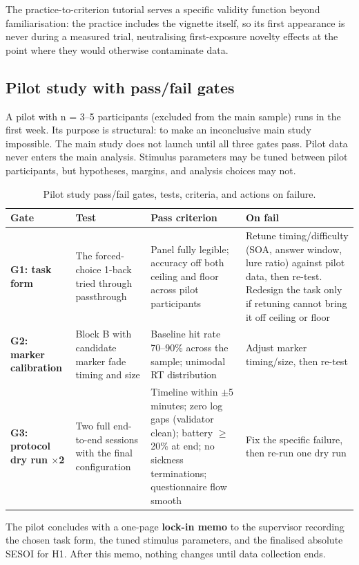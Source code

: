 The practice-to-criterion tutorial serves a specific validity function beyond familiarisation: the
practice includes the vignette itself, so its first appearance is never during a measured trial,
neutralising first-exposure novelty effects at the point where they would otherwise contaminate data.

\subsection{Pilot study with pass/fail gates}

A pilot with n = 3–5 participants (excluded from the main sample) runs in the first week. Its purpose
is structural: to make an inconclusive main study impossible. The main study does not launch until
all three gates pass. Pilot data never enters the main analysis. Stimulus parameters may be tuned
between pilot participants, but hypotheses, margins, and analysis choices may not.

\begin{longtable}{p{}|p{}|p{}|p{}}
\caption{Pilot study pass/fail gates, tests, criteria, and actions on failure.}\\
\hline
\textbf{Gate} & \textbf{Test} & \textbf{Pass criterion} & \textbf{On fail} \\
\hline
\endhead
\hline
\textbf{G1: task form} & The forced-choice 1-back tried through passthrough & Panel fully legible; accuracy off both ceiling and floor across pilot participants & Retune timing/difficulty (SOA, answer window, lure ratio) against pilot data, then re-test. Redesign the task only if retuning cannot bring it off ceiling or floor \\
\textbf{G2: marker calibration} & Block B with candidate marker fade timing and size & Baseline hit rate 70–90\% across the sample; unimodal RT distribution & Adjust marker timing/size, then re-test \\
\textbf{G3: protocol dry run $\times$2} & Two full end-to-end sessions with the final configuration & Timeline within $\pm$5 minutes; zero log gaps (validator clean); battery $\geq$ 20\% at end; no sickness terminations; questionnaire flow smooth & Fix the specific failure, then re-run one dry run \\
\hline
\end{longtable}

The pilot concludes with a one-page \textbf{lock-in memo} to the supervisor recording the chosen task
form, the tuned stimulus parameters, and the finalised absolute SESOI for H1. After this memo,
nothing changes until data collection ends.

